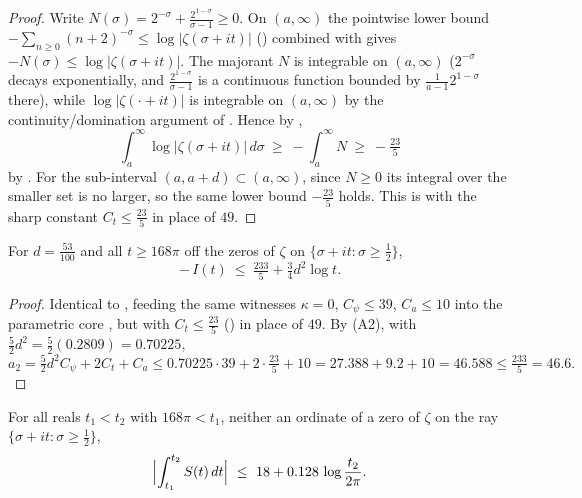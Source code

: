 \begin{proof}
\leanok
Write $N(\sigma)=2^{-\sigma}+\tfrac{2^{1-\sigma}}{\sigma-1}\ge0$. On $(a,\infty)$ the
pointwise lower bound
$-\!\sum_{n\ge0}(n+2)^{-\sigma}\le\log|\zeta(\sigma+it)|$
() combined with
 gives $-N(\sigma)\le\log|\zeta(\sigma+it)|$. The majorant $N$
is integrable on $(a,\infty)$ ($2^{-\sigma}$ decays exponentially, and
$\tfrac{2^{1-\sigma}}{\sigma-1}$ is a continuous function bounded by
$\tfrac1{a-1}2^{1-\sigma}$ there), while $\log|\zeta(\cdot+it)|$ is integrable on
$(a,\infty)$ by the continuity/domination argument of . Hence
by ,
\[
  \int_a^\infty\log|\zeta(\sigma+it)|\,d\sigma\ \ge\ -\int_a^\infty N
    \ \ge\ -\tfrac{23}5
\]
by . For the sub-interval $(a,a+d)\subset(a,\infty)$, since
$N\ge0$ its integral over the smaller set is no larger, so the same lower bound
$-\tfrac{23}5$ holds. This is  with the sharp constant
$C_t\le\tfrac{23}5$ in place of $49$.
\end{proof}

\begin{lemma}
\label{lem:le_I_lower_sharp}
\leanok
{}
For $d=\tfrac{53}{100}$ and all $t\ge168\pi$ off the zeros of $\zeta$ on
$\{\sigma+it:\sigma\ge\tfrac12\}$,
\[
  -\,I(t)\ \le\ \tfrac{233}5+\tfrac34 d^2\log t .
\]
\end{lemma}

\begin{proof}
\leanok
Identical to , feeding the same witnesses
$\kappa=0$, $C_\psi\le39$, $C_a\le10$ into the parametric core
, but with $C_t\le\tfrac{23}5$
() in place of $49$. By (A2), with
$\tfrac52 d^2=\tfrac52(0.2809)=0.70225$,
\[
  a_2=\tfrac52 d^2 C_\psi+2C_t+C_a
     \le 0.70225\cdot39+2\cdot\tfrac{23}5+10
     =27.388+9.2+10=46.588\le\tfrac{233}5=46.6 .
\]
\end{proof}

\begin{theorem}
\label{thm:le_sharp}
\leanok
{}
For all reals $t_1<t_2$ with $168\pi<t_1$, neither an ordinate of a zero of $\zeta$ on
the ray $\{\sigma+it:\sigma\ge\tfrac12\}$,
\[
  \Bigl|\int_{t_1}^{t_2}S(t)\,dt\Bigr|\ \le\ 18+0.128\,\log\frac{t_2}{2\pi} .
\]
\end{theorem}

